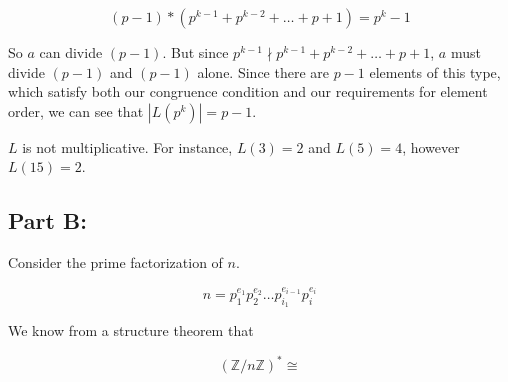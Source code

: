 \documentclass[12pt]{article}
\theoremstyle{moo}
\def\zz{{\mathbb Z}}
\begin{document}
\[(p-1)*(p^{k-1} + p^{k-2} + \ldots + p + 1) = p^k - 1 \]

So $a$ can divide $(p-1)$. But since $p^{k-1} \nmid p^{k-1} + p^{k-2} + \ldots + p + 1$, $a$ must divide $(p-1)$ and $(p-1)$ alone. Since there are $p-1$ elements of this type, which satisfy both our congruence condition and our requirements for element order, we can see that $|L(p^k)| = p-1$.

$L$ is not multiplicative. For instance, $L(3) = 2$ and $L(5) = 4$, however $L(15) = 2$.


\subsection*{Part B:}
Consider the prime factorization of $n$.

\[
n = p_1^{e_1}p_2^{e_2} \ldots p_{i_1}^{e_{i-1}}p_i^{e_i}
\]

We know from a structure theorem that 

\[
\left(\zz/n\zz\right)^* \cong 
\]
\end{document}

